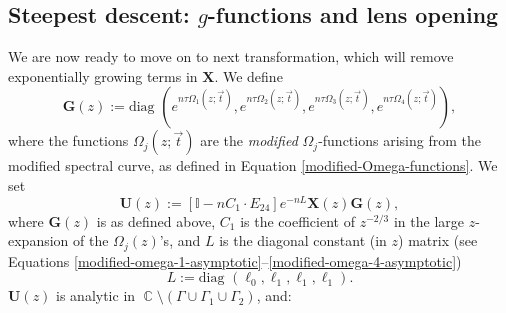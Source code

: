 \documentclass[usenames,dvipsnames]{article}
\theoremstyle{definition}
\DeclareMathOperator{\CC}{\mathbb{C}}
\numberwithin{equation}{section}
\numberwithin{figure}{section}
\begin{document}
\subsection{Steepest descent: $g$-functions and lens opening}
We are now ready to move on to next transformation, which will remove exponentially growing terms in $\boldsymbol{X}$. We define
    \begin{equation}\label{G-matrix}
        \boldsymbol{G}(z) := \text{diag }(e^{n\tau\Omega_1(z;\vec{t})},e^{n\tau\Omega_2(z;\vec{t})},e^{n\tau\Omega_3(z;\vec{t})},e^{n\tau\Omega_4(z;\vec{t})}),
    \end{equation}
where the functions $\Omega_j(z;\vec{t})$ are the \textit{modified} $\Omega_j$-functions arising from the modified spectral curve, 
as defined in Equation \eqref{modified-Omega-functions}. We set
    \begin{equation}
        \boldsymbol{U}(z) := \left[\mathbb{I} - nC_1\cdot E_{24}\right] e^{-nL}\boldsymbol{X}(z)\boldsymbol{G}(z),
    \end{equation}
where $\boldsymbol{G}(z)$ is as defined above, $C_1$ is the coefficient of $z^{-2/3}$ in the large $z$-expansion of the $\Omega_j(z)$'s, and $L$ is the diagonal constant (in $z$) matrix (see Equations \eqref{modified-omega-1-asymptotic}--\eqref{modified-omega-4-asymptotic})
    \begin{equation}
        L := \text{diag } (\ell_0, \ell_1, \ell_1, \ell_1). 
    \end{equation}
$\boldsymbol{U}(z)$ is analytic in $\CC \setminus (\Gamma \cup \Gamma_1 \cup \Gamma_2 )$, and:
\end{document}
